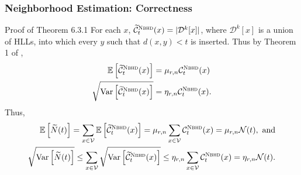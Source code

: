 \documentclass{beamer}
\newcommand{\algoname}[1]{\textnormal{\textsc{#1}}}
\newcommand{\E}{\mathbb{E}}
\newcommand{\Var}{\textnormal{Var}}
\begin{document}

\begin{frame}
\frametitle{Neighborhood Estimation: Correctness}

\begin{block}{Proof of Theorem 6.3.1}
For each $x$, $\widetilde{\mathcal{C}}^{\algoname{Nbhd}}_t(x) = |\mathcal{D}^k[x]|$, where $\mathcal{D}^k[x]$ is a union of \algoname{HLL}s, into which every $y$ such that $d(x,y) < t$ is inserted. 
Thus by Theorem 1 of \cite{flajolet2007hyperloglog}, 
%
\begin{align*}
\E \left [ \widetilde{\mathcal{C}}^{\algoname{Nbhd}}_t(x) \right ] 
&= \mu_{r,n} \mathcal{C}^{\algoname{Nbhd}}_t(x) \\
\sqrt{\Var \left [ \widetilde{\mathcal{C}}^{\algoname{Nbhd}}_t(x) \right ]} 
&= \eta_{r,n} \mathcal{C}^{\algoname{Nbhd}}_t(x).
\end{align*}
%
Thus, 
\begin{align*}
\E \left [ \widetilde{N}(t) \right ] 
= \sum_{x \in \mathcal{V}} \E \left [ \widetilde{\mathcal{C}}^{\algoname{Nbhd}}_t(x) \right ]  
= \mu_{r, n} \sum_{x \in \mathcal{V}} \mathcal{C}^{\algoname{Nbhd}}_t(x)  
= \mu_{r,n} \mathcal{N}(t),
\textnormal{ and} \\
%
%
\sqrt{\Var \left [ \widetilde{N}(t) \right ]} 
\leq \sum_{x \in \mathcal{V}} \sqrt{\Var \left [ \widetilde{\mathcal{C}}^{\algoname{Nbhd}}_t(x) \right ]}  
\leq \eta_{r, n} \sum_{x \in \mathcal{V}} \mathcal{C}^{\algoname{Nbhd}}_t(x)  
= \eta_{r, n} \mathcal{N}(t).
\end{align*}

\end{block}

\end{frame}


\end{document}
